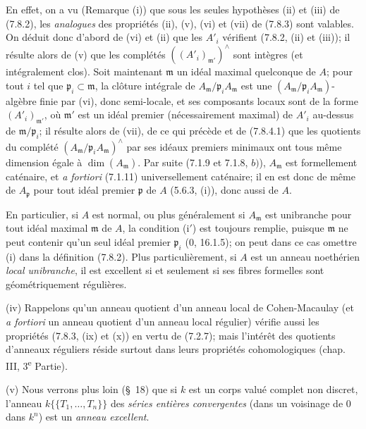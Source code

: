 \begin{remarks}[7.8.4]
En effet, on a vu (Remarque (i)) que sous les seules hypothèses (ii) et (iii)
de (7.8.2), les \emph{analogues} des propriétés (ii), (v), (vi) et (vii) de
(7.8.3) sont valables. On déduit donc d'abord de (vi) et (ii) que les $A'_i$
vérifient (7.8.2, (ii) et (iii)); il résulte alors de (v) que les complétés
$((A'_i)_{\mathfrak m'})^\wedge$ sont intègres (et intégralement clos). Soit
maintenant $\mathfrak m$ un idéal maximal quelconque de $A$; pour tout $i$ tel
que $\mathfrak p_i\subset\mathfrak m$, la clôture intégrale de
$A_{\mathfrak m}/\mathfrak p_iA_{\mathfrak m}$ est une
$(A_{\mathfrak m}/\mathfrak p_iA_{\mathfrak m})$-algèbre finie par (vi), donc
semi-locale, et ses composants locaux sont de la forme
$(A'_i)_{\mathfrak m'}$, où $\mathfrak m'$ est un idéal premier
(nécessairement maximal) de $A'_i$ au-dessus de
$\mathfrak m/\mathfrak p_i$; il résulte alors de (vii), de ce qui précède et de
(7.8.4.1) que les quotients du complété
$(A_{\mathfrak m}/\mathfrak p_iA_{\mathfrak m})^\wedge$ par ses idéaux
premiers minimaux ont tous même dimension égale à $\dim(A_{\mathfrak m})$. Par
suite (7.1.9 et 7.1.8, $b)$), $A_{\mathfrak m}$ est formellement caténaire, et
\emph{a fortiori} (7.1.11) universellement caténaire; il en est donc de même de
$A_{\mathfrak p}$ pour tout idéal premier $\mathfrak p$ de $A$ (5.6.3, (i)),
donc aussi de $A$.

En particulier, si $A$ est normal, ou plus généralement si $A_{\mathfrak m}$
est unibranche pour tout idéal maximal $\mathfrak m$ de $A$, la condition
(i$'$) est toujours remplie, puisque $\mathfrak m$ ne peut contenir qu'un seul
idéal premier $\mathfrak p_i$ (0, 16.1.5); on peut dans ce cas omettre (i) dans
la définition (7.8.2). Plus particulièrement, si $A$ est un anneau noethérien
\emph{local unibranche}, il est excellent si et seulement si ses fibres
formelles sont géométriquement régulières.

(iv) Rappelons qu'un anneau quotient d'un anneau local de Cohen-Macaulay (et
\emph{a fortiori} un anneau quotient d'un anneau local régulier) vérifie aussi
les propriétés (7.8.3, (ix) et (x)) en vertu de (7.2.7); mais l'intérêt des
quotients d'anneaux réguliers réside surtout dans leurs propriétés
cohomologiques (chap. III, 3\textsuperscript{e} Partie).

(v) Nous verrons plus loin (\S~18) que si $k$ est un corps valué complet non
discret, l'anneau $k\{\!\{T_1,\ldots,T_n\}\!\}$ des \emph{séries entières
convergentes} (dans un voisinage de $0$ dans $k^n$) est un \emph{anneau
excellent}.
\end{remarks}

